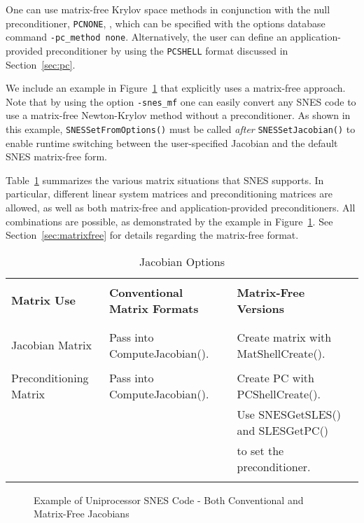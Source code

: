 One can use matrix-free Krylov space methods
in conjunction with the null preconditioner, {\tt PCNONE},
, which can be specified with the options database command 
{\tt -pc\_method none}.  Alternatively, the user can define an
application-provided preconditioner by using the {\tt PCSHELL} 
 format discussed in Section~\ref{sec:pc}.

We include an example in Figure~\ref{fig:snesexample2} that explicitly
uses a matrix-free approach.  Note that by using the option 
{\tt -snes\_mf} one can easily convert any SNES code to use a matrix-free
Newton-Krylov method without a preconditioner.  As shown in this
example, {\tt SNESSetFromOptions()} must be called {\em after}
{\tt SNESSetJacobian()} to enable runtime switching between the
user-specified Jacobian and the default SNES matrix-free form.

Table~\ref{table:jacobians} summarizes the various matrix situations
that SNES supports.  In particular, different linear system matrices
and preconditioning matrices are allowed, as well as both matrix-free
and application-provided preconditioners.  All combinations are
possible, as demonstrated by the example in Figure~\ref{fig:snesexample2}.
See Section~\ref{sec:matrixfree} for details regarding the matrix-free
format.

\begin{table}[H]
\caption{Jacobian Options}
\begin{tabular}{|l|l|l|} \hline
& & \\
{\bf Matrix Use}      & {\bf Conventional Matrix Formats}          & {\bf Matrix-Free Versions}\\ 
& & \\ \hline
& & \\
Jacobian Matrix        & Pass into ComputeJacobian(). & Create matrix with MatShellCreate().\\
& & \\
Preconditioning Matrix & Pass into ComputeJacobian(). & Create PC with PCShellCreate().\\
& &                                        Use SNESGetSLES() and SLESGetPC()\\
& &                                        to set the preconditioner.\\ 
& & \\ \hline
\end{tabular}
\label{table:jacobians}
\end{table}

\begin{figure}[H]
{\small
{}
}
\caption{Example of Uniprocessor SNES Code - Both Conventional and Matrix-Free Jacobians}
\label{fig:snesexample2}
\end{figure} 

